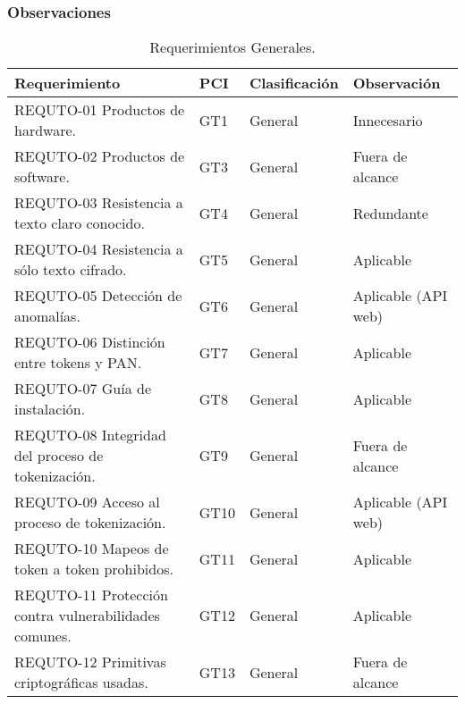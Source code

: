 %
%

\subsubsection{Observaciones}

\begin{table}[H]
  \centering
  \begin{tabular}{| p{5.5cm} | p{2cm} | p{4cm} | p{4cm} |}

    \hline
      \textbf{Requerimiento}    &
      \textbf{PCI}              &
      \textbf{Clasificación}    &
      \textbf{Observación}     \\ [0.8ex]
    \hline

    REQUTO-01 Productos de hardware.  
    &  GT1   &  General  &  Innecesario           \\ \hline
    REQUTO-02 Productos de software.  
    &  GT3   &  General  &  Fuera de alcance      \\ \hline
    REQUTO-03 Resistencia a texto claro conocido.  
    &  GT4   &  General  &  Redundante            \\ \hline
    REQUTO-04 Resistencia a sólo texto cifrado.  
    &  GT5   &  General  &  Aplicable             \\ \hline
    REQUTO-05 Detección de anomalías.  
    &  GT6   &  General  &  Aplicable (API web)   \\ \hline
    REQUTO-06 Distinción entre tokens y PAN.  
    &  GT7   &  General  &  Aplicable             \\ \hline
    REQUTO-07 Guía de instalación.  
    &  GT8   &  General  &  Aplicable             \\ \hline
    REQUTO-08 Integridad del proceso de tokenización.  
    &  GT9   &  General  &  Fuera de alcance      \\ \hline
    REQUTO-09 Acceso al proceso de tokenización.  
    &  GT10  &  General  &  Aplicable (API web)   \\ \hline
    REQUTO-10 Mapeos de token a token prohibidos.  
    &  GT11  &  General  &  Aplicable             \\ \hline
    REQUTO-11 Protección contra vulnerabilidades comunes.  
    &  GT12  &  General  &  Aplicable             \\ \hline
    REQUTO-12 Primitivas criptográficas usadas.  
    &  GT13  &  General  &  Fuera de alcance      \\ \hline

  \end{tabular}
  \caption{Requerimientos Generales.}
\end{table}

